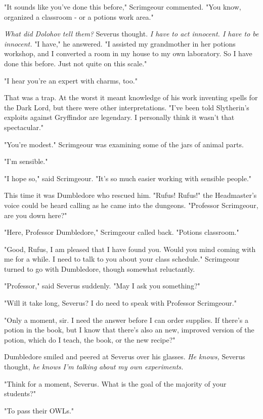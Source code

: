 "It sounds like you've done this before," Scrimgeour commented. "You know, organized a classroom - or a potions work area."

\emph{What did Dolohov tell them?} Severus thought. \emph{I have to act innocent. I have to be innocent.} "I have," he answered. "I assisted my grandmother in her potions workshop, and I converted a room in my house to my own laboratory. So I have done this before. Just not quite on this scale."

"I hear you're an expert with charms, too."

That was a trap. At the worst it meant knowledge of his work inventing spells for the Dark Lord, but there were other interpretations. "I've been told Slytherin's exploits against Gryffindor are legendary. I personally think it wasn't that spectacular."

"You're modest." Scrimgeour was examining some of the jars of animal parts.

"I'm sensible."

"I hope so," said Scrimgeour. "It's so much easier working with sensible people."

This time it was Dumbledore who rescued him. "Rufus! Rufus!" the Headmaster's voice could be heard calling as he came into the dungeons. "Professor Scrimgeour, are you down here?"

"Here, Professor Dumbledore," Scrimgeour called back. "Potions classroom."

"Good, Rufus, I am pleased that I have found you. Would you mind coming with me for a while. I need to talk to you about your class schedule." Scrimgeour turned to go with Dumbledore, though somewhat reluctantly.

"Professor," said Severus suddenly. "May I ask you something?"

"Will it take long, Severus? I do need to speak with Professor Scrimgeour."

"Only a moment, sir. I need the answer before I can order supplies. If there's a potion in the book, but I know that there's also an new, improved version of the potion, which do I teach, the book, or the new recipe?"

Dumbledore smiled and peered at Severus over his glasses. \emph{He knows,} Severus thought, \emph{he knows I'm talking about my own experiments.}

"Think for a moment, Severus. What is the goal of the majority of your students?"

"To pass their OWLs."

